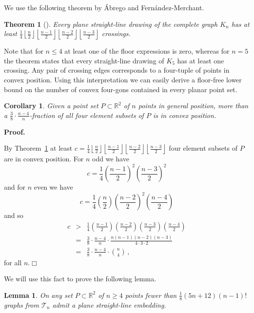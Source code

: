 \documentclass[11pt]{article}
\newtheorem{lemma}[equation]{Lemma}
\newtheorem{corollary}[equation]{Corollary}
\newtheorem{theorem}[equation]{Theorem}
\newcommand{\qed}{\hfill\ensuremath{\Box}}
\newenvironment{proof}{\noindent\textbf{Proof.}
}{\par\medskip}
\newcommand{\R}{\ensuremath{\mathds R}}
\newcommand{\T}{\ensuremath{\mathcal T}}
\begin{document}
\noindent We use the following theorem by \'{A}brego and Fern\'{a}ndez-Merchant.
\begin{theorem}[\cite{AF05}]\label{t:cn}
  Every plane straight-line drawing of the complete graph $K_n$ has at
  least $\frac 1 4\left\lfloor\frac{n }{2}\right\rfloor \left\lfloor\frac{n-1}{2}\right\rfloor \left\lfloor\frac{n-2}{2}\right\rfloor \left\lfloor\frac{n-3}{2}\right\rfloor$ crossings.
\end{theorem}
Note that for $n\le 4$ at least one of the floor expressions is zero, whereas
for $n=5$ the theorem states that every straight-line drawing of $K_5$ has at
least one crossing. Any pair of crossing edges corresponds to a four-tuple of
points in convex position. Using this interpretation we can easily derive a
floor-free lower bound on the number of convex four-gons contained in every
planar point set.
\begin{corollary}\label{cor:convex_4_tuples}
  Given a point set $P\subset\R^2$ of $n$ points in general position,
  more than a $\frac{3}{8}\cdot\frac{n-4}{n}$-fraction of all four
  element subsets of $P$ is in convex position.
\end{corollary}
\begin{proof}
  By Theorem~\ref{t:cn} at least $c = \frac 1 4\left\lfloor\frac{n }{2}\right\rfloor \left\lfloor\frac{n-1}{2}\right\rfloor \left\lfloor\frac{n-2}{2}\right\rfloor \left\lfloor\frac{n-3}{2}\right\rfloor$ four element subsets of $P$ are in convex position. For $n$ odd we
  have
\[c=\frac{1}{4}\left(\frac{n-1}{2}\right)^2\left(\frac{n-3}{2}\right)^2\]
and for $n$ even we have
\[c=\frac{1}{4}\left(\frac{n}{2}\right)\left(\frac{n-2}{2}\right)^2\left(\frac{n-4}{2}\right)\]
and so
\begin{eqnarray*}
    c &>&
    \frac{1}{4}\left(\frac{n-1}{2}\right)\left(\frac{n-2}{2}\right)\left(\frac{n-3}{2}\right)\left(\frac{n-4}{2}\right)\\
    &=&
    \frac{3}{8}\cdot\frac{n-4}{n}\cdot\frac{n(n-1)(n-2)(n-3)}{4\cdot
      3\cdot 2}\\
    &=&
    \frac{3}{8}\cdot\frac{n-4}{n}\cdot\binom{n}{4}\,,
  \end{eqnarray*}
for all $n$.\qed
\end{proof}
We will use this fact to prove the following lemma.
\begin{lemma}\label{lem:tn_on_point_set}
  On any set $P\subset\R^2$ of $n\ge 4$ points fewer than
  $\frac{1}{8}(5n+12)(n-1)!$ graphs from $\T_n$ admit a plane
  straight-line embedding.
\end{lemma}
\end{document}
